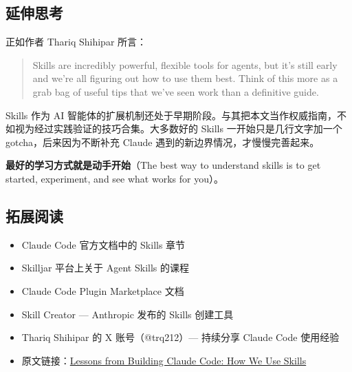 \documentclass[a4paper]{article}
\begin{document}
\subsection{延伸思考}

正如作者 Thariq Shihipar 所言：

\begin{quote}
Skills are incredibly powerful, flexible tools for agents, but it's still early and we're all figuring out how to use them best. Think of this more as a grab bag of useful tips that we've seen work than a definitive guide.
\end{quote}

Skills 作为 AI 智能体的扩展机制还处于早期阶段。与其把本文当作权威指南，不如视为经过实践验证的技巧合集。大多数好的 Skills 一开始只是几行文字加一个 gotcha，后来因为不断补充 Claude 遇到的新边界情况，才慢慢完善起来。

\textbf{最好的学习方式就是动手开始}（The best way to understand skills is to get started, experiment, and see what works for you）。

\subsection{拓展阅读}

\begin{itemize}
    \item Claude Code 官方文档中的 Skills 章节
    \item Skilljar 平台上关于 Agent Skills 的课程
    \item Claude Code Plugin Marketplace 文档
    \item Skill Creator --- Anthropic 发布的 Skills 创建工具
    \item Thariq Shihipar 的 X 账号（@trq212）--- 持续分享 Claude Code 使用经验
    \item 原文链接：\href{https://x.com/trq212/status/2033949937936085378}{Lessons from Building Claude Code: How We Use Skills}
\end{itemize}

\end{document}
